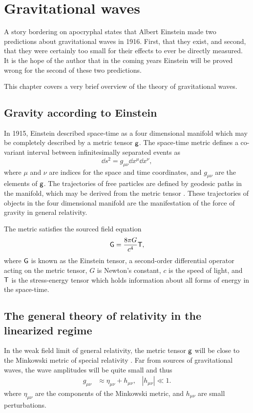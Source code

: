 \chapter{Gravitational waves}
\label{ch:gws}
A story bordering on apocryphal states that Albert Einstein made two predictions about gravitational waves in 1916. %
First, that they exist, and second, that they were certainly too small for their effects to ever be directly measured. %
It is the hope of the author that in the coming years Einstein will be proved wrong for the second of these two predictions.

This chapter covers a very brief overview of the theory of gravitational waves. %


\section{Gravity according to Einstein}
In 1915, Einstein described space-time as a four dimensional manifold which may be completely described by a metric tensor $\mathsf{g}$. %
The space-time metric defines a co-variant interval between infinitesimally separated events as
\begin{equation}
\dd s^2 = g_{\mu \nu}\dd x^\mu \dd x^\nu,
\end{equation}
where $\mu$ and $\nu$ are indices for the space and time coordinates, and $g_{\mu \nu}$ are the elements of $\mathsf{g}$. %
The trajectories of free particles are defined by geodesic paths in the manifold, which may be derived from the metric tensor \cite[Chap. %
3]{carroll2004spacetime}. %
These trajectories of objects in the four dimensional manifold are the manifestation of the force of gravity in general relativity.

The metric satisfies the sourced field equation
\begin{equation}
\label{eqn:einstein}
\mathsf{G}=\frac{8\pi G}{c^4}\mathsf{T},
\end{equation}
where $\mathsf{G}$ is known as the Einstein tensor, a second-order differential operator acting on the metric tensor, $G$ is Newton's constant, $c$ is the speed of light, and $\mathsf{T}$ is the stress-energy tensor which holds information about all forms of energy in the space-time.

\section{The general theory of relativity in the linearized regime}
In the weak field limit of general relativity, the metric tensor $\mathsf{g}$ will be close to the Minkowski metric of special relativity \cite[Chap. %
7]{carroll2004spacetime}. %
Far from sources of gravitational waves, the wave amplitudes will be quite small and thus
\begin{align}
g_{\mu \nu}&\approx \eta_{\mu \nu}+h_{\mu \nu}, &|h_{\mu \nu}|\ll 1.
\end{align}
where $\eta_{\mu \nu}$ are the components of the Minkowski metric, and $h_{\mu \nu}$ are small perturbations.

